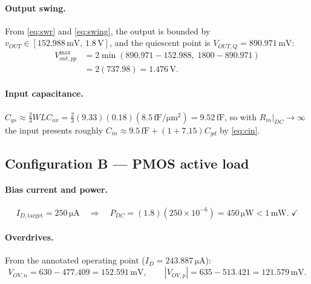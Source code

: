 \documentclass[12pt,a4paper]{article}
\newcommand{\U}[1]{\,\mathrm{#1}}
\begin{document}
\paragraph{Output swing.}
From \eqref{eq:swr} and \eqref{eq:swing}, the output is bounded by
$v_{OUT}\in[152.988\U{mV},\,1.8\U{V}]$, and the quiescent point is
$V_{OUT,Q}=890.971\U{mV}$:
\begin{align*}
V_{out,pp}^{\max} &= 2\min(890.971-152.988,\;1800-890.971)\\
                  &= 2(737.98) = 1.476\U{V}.
\end{align*}

\paragraph{Input capacitance.}
$C_{gs}\approx \tfrac{2}{3}W L C_{ox}
 = \tfrac{2}{3}(9.33)(0.18)(8.5\U{fF/\mu m^2}) = 9.52\U{fF}$, so with
$R_{in}|_{DC}\to\infty$ the input presents roughly
$C_{in}\approx 9.5\U{fF}+(1+7.15)C_{gd}$ by \eqref{eq:cin}.

\subsection{Configuration B --- PMOS active load}
\paragraph{Bias current and power.}
\[
I_{D,\text{target}} = 250\U{\mu A}
\quad\Rightarrow\quad
P_{DC} = (1.8)(250\times10^{-6}) = 450\U{\mu W} < 1\U{mW}.\;\checkmark
\]

\paragraph{Overdrives.}
From the annotated operating point ($I_D = 243.887\U{\mu A}$):
\[
V_{OV,n} = 630 - 477.409 = 152.591\U{mV},
\qquad
|V_{OV,p}| = 635 - 513.421 = 121.579\U{mV}.
\]
\end{document}
